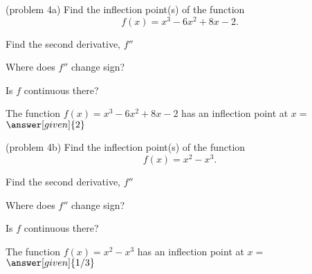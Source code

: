 \documentclass{ximera}
\begin{document}
\begin{example}[example 4]
\begin{image}
\end{image}

\end{example}


\begin{problem}(problem 4a)
  Find the inflection point(s) of the function
  \[
     f(x) = x^3 - 6x^2 + 8x - 2.
  \]
 
    \begin{hint}
      Find the second derivative, $f''$
    \end{hint}
    \begin{hint}
      Where does $f''$ change sign?
    \end{hint}
    \begin{hint}
      Is $f$ continuous there?
    \end{hint}    
		The function $f(x) = x^3 - 6x^2 + 8x - 2$ has an inflection point at $x =$
		 $\answer[given]{2}$
	
\end{problem}


\begin{problem}(problem 4b)
  Find the inflection point(s) of the function
  \[
     f(x) = x^2 - x^3.
  \]
  
    \begin{hint}
      Find the second derivative, $f''$
    \end{hint}
    \begin{hint}
      Where does $f''$ change sign?
    \end{hint}
    \begin{hint}
      Is $f$ continuous there?
    \end{hint}    
		The function $f(x) = x^2 - x^3$ has an inflection point at $x =$
		 $\answer[given]{1/3}$
		
\end{problem}
\end{document}
